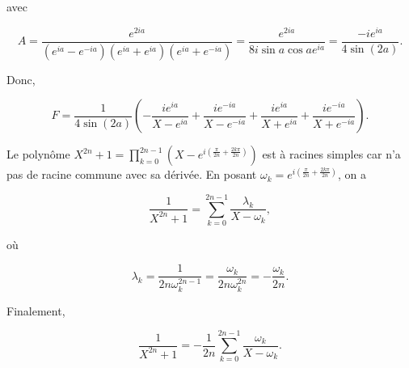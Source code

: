 {{\begin{itemize}
avec 

$$A=\frac{e^{2ia}}{(e^{ia}-e^{-ia})(e^{ia}+e^{ia})(e^{ia}+e^{-ia})}=\frac{e^{2ia}}{8i\sin a\cos ae^{ia}}=\frac{-ie^{ia}}{4\sin(2a)}.$$

Donc,

$$F=\frac{1}{4\sin(2a)}(-\frac{ie^{ia}}{X-e^{ia}}+\frac{ie^{-ia}}{X-e^{-ia}}+\frac{ie^{ia}}{X+e^{ia}}+\frac{ie^{-ia}}{X+e^{-ia}}).$$

\end{itemize}
Le polynôme $X^{2n}+1=\prod_{k=0}^{2n-1}(X-e^{i(\frac{\pi}{2n}+\frac{2k\pi}{2n})})$ est à racines simples car n'a pas de racine commune avec sa dérivée. En posant $\omega_k=e^{i(\frac{\pi}{2n}+\frac{2k\pi}{2n})}$, on a

$$\frac{1}{X^{2n}+1}=\sum_{k=0}^{2n-1}\frac{\lambda_k}{X-\omega_k},$$

où 

$$\lambda_k=\frac{1}{2n\omega_k^{2n-1}}=\frac{\omega_k}{2n\omega_k^{2n}}=-\frac{\omega_k}{2n}.$$

Finalement,

$$\frac{1}{X^{2n}+1}=-\frac{1}{2n}\sum_{k=0}^{2n-1}\frac{\omega_k}{X-\omega_k}.$$
}
}
